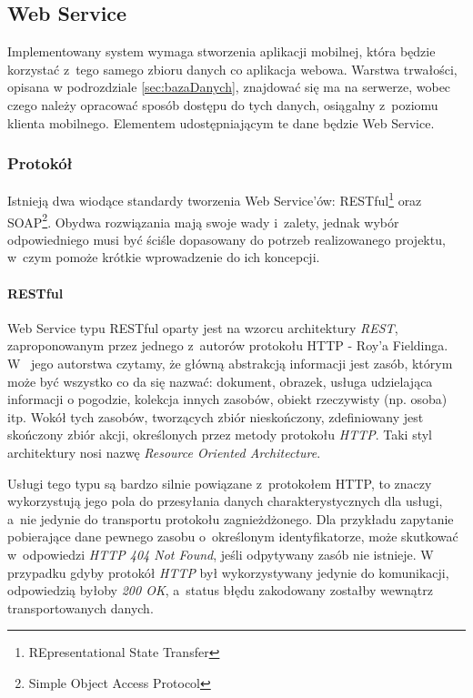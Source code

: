 \documentclass[11pt]{aghdpl}
\begin{document}
\subsection{Web Service}

Implementowany system wymaga stworzenia aplikacji mobilnej, która będzie korzystać z~tego samego zbioru danych co aplikacja webowa. Warstwa trwałości, opisana w podrozdziale \ref{sec:bazaDanych}, znajdować się ma na serwerze, wobec czego należy opracować sposób dostępu do tych danych, osiągalny z~poziomu klienta mobilnego. Elementem udostępniającym te dane będzie Web Service.

\subsubsection{Protokół}

Istnieją dwa wiodące standardy tworzenia Web Service'ów: RESTful\footnote{REpresentational State Transfer} oraz SOAP\footnote{Simple Object Access Protocol}. Obydwa rozwiązania mają swoje wady i~zalety, jednak wybór odpowiedniego musi być ściśle dopasowany do potrzeb realizowanego projektu, w~czym pomoże krótkie wprowadzenie do ich koncepcji.

\paragraph{RESTful}

Web Service typu RESTful oparty jest na wzorcu architektury \emph{REST}, zaproponowanym przez jednego z~autorów protokołu HTTP - Roy'a Fieldinga. W~\cite{RFD} jego autorstwa czytamy, że główną abstrakcją informacji jest zasób, którym może być wszystko co da się nazwać: dokument, obrazek, usługa udzielająca informacji o pogodzie, kolekcja innych zasobów, obiekt rzeczywisty (np. osoba) itp. Wokół tych zasobów, tworzących zbiór nieskończony, zdefiniowany jest skończony zbiór akcji, określonych przez metody protokołu \emph{HTTP}. Taki styl architektury nosi nazwę \emph{Resource Oriented Architecture}.

Usługi tego typu są bardzo silnie powiązane z~protokołem HTTP, to znaczy wykorzystują jego pola do przesyłania danych charakterystycznych dla usługi, a~nie jedynie do transportu protokołu zagnieżdżonego. Dla przykładu zapytanie pobierające dane pewnego zasobu o~określonym identyfikatorze, może skutkować w~odpowiedzi \emph{HTTP 404 Not Found}, jeśli odpytywany zasób nie istnieje. W przypadku gdyby protokół \emph{HTTP} był wykorzystywany jedynie do komunikacji, odpowiedzią byłoby \emph{200 OK}, a~status błędu zakodowany zostałby wewnątrz transportowanych danych.
\end{document}
